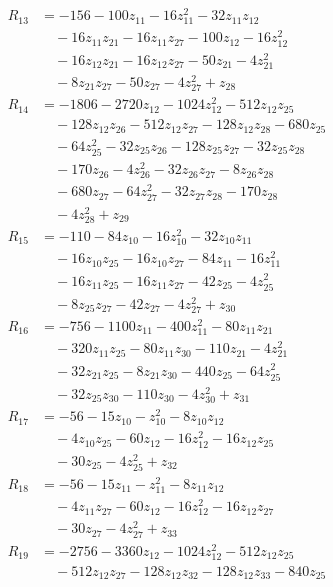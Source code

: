 \begin{align*}
R_{13} &= -156 -100z_{11} -16z_{11}^{2} -32z_{11}z_{12} \\
&\quad -16z_{11}z_{21} -16z_{11}z_{27} -100z_{12} -16z_{12}^{2} \\
&\quad -16z_{12}z_{21} -16z_{12}z_{27} -50z_{21} -4z_{21}^{2} \\
&\quad -8z_{21}z_{27} -50z_{27} -4z_{27}^{2} +z_{28} \\
R_{14} &= -1806 -2720z_{12} -1024z_{12}^{2} -512z_{12}z_{25} \\
&\quad -128z_{12}z_{26} -512z_{12}z_{27} -128z_{12}z_{28} -680z_{25} \\
&\quad -64z_{25}^{2} -32z_{25}z_{26} -128z_{25}z_{27} -32z_{25}z_{28} \\
&\quad -170z_{26} -4z_{26}^{2} -32z_{26}z_{27} -8z_{26}z_{28} \\
&\quad -680z_{27} -64z_{27}^{2} -32z_{27}z_{28} -170z_{28} \\
&\quad -4z_{28}^{2} +z_{29} \\
R_{15} &= -110 -84z_{10} -16z_{10}^{2} -32z_{10}z_{11} \\
&\quad -16z_{10}z_{25} -16z_{10}z_{27} -84z_{11} -16z_{11}^{2} \\
&\quad -16z_{11}z_{25} -16z_{11}z_{27} -42z_{25} -4z_{25}^{2} \\
&\quad -8z_{25}z_{27} -42z_{27} -4z_{27}^{2} +z_{30} \\
R_{16} &= -756 -1100z_{11} -400z_{11}^{2} -80z_{11}z_{21} \\
&\quad -320z_{11}z_{25} -80z_{11}z_{30} -110z_{21} -4z_{21}^{2} \\
&\quad -32z_{21}z_{25} -8z_{21}z_{30} -440z_{25} -64z_{25}^{2} \\
&\quad -32z_{25}z_{30} -110z_{30} -4z_{30}^{2} +z_{31} \\
R_{17} &= -56 -15z_{10} -z_{10}^{2} -8z_{10}z_{12} \\
&\quad -4z_{10}z_{25} -60z_{12} -16z_{12}^{2} -16z_{12}z_{25} \\
&\quad -30z_{25} -4z_{25}^{2} +z_{32} \\
R_{18} &= -56 -15z_{11} -z_{11}^{2} -8z_{11}z_{12} \\
&\quad -4z_{11}z_{27} -60z_{12} -16z_{12}^{2} -16z_{12}z_{27} \\
&\quad -30z_{27} -4z_{27}^{2} +z_{33} \\
R_{19} &= -2756 -3360z_{12} -1024z_{12}^{2} -512z_{12}z_{25} \\
&\quad -512z_{12}z_{27} -128z_{12}z_{32} -128z_{12}z_{33} -840z_{25} \\

\end{align*}
